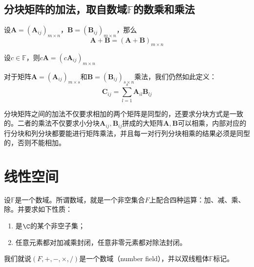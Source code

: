         \subsection{分块矩阵的加法，取自数域$\mathbb{F}$的数乘和乘法}
        设$\bm{A}=(\bm{A}_{ij})_{m\times n}$，$\bm{B}=(\bm{B}_{ij})_{m\times n}$，那么
        \begin{equation}
            \label{eq:15}
            \bm{A}+\bm{B}=(\bm{A}+\bm{B})_{m\times n}
        \end{equation}
        
        设$c\in\mathbb{F}$，则$c\bm{A}=(c\bm{A}_{ij})_{m\times n}$

        对于矩阵$\bm{A}=(\bm{A}_{ij})_{m\times s}$和$\bm{B}=(\bm{B}_{ij})_{s\times n}$乘法，我们仍然如此定义：
        \begin{equation}
            \label{eq:16}
            \bm{C}_{ij}=\sum_{l=1}^{s}\bm{A}_{il}\bm{B}_{lj}
        \end{equation}

        \begin{note}
            分块矩阵之间的加法不仅要求相加的两个矩阵是同型的，还要求分块方式是一致的。二者的乘法不仅要求小分块$\bm{A}_{ij},\bm{B}_{ij}$拼成的大矩阵$\bm{A},\bm{B}$可以相乘，内部对应的行分块和列分块都要能进行矩阵乘法，并且每一对行列分块相乘的结果必须是同型的，否则不能相加。
        \end{note}

    \section{线性空间}
    设$\mathbb{F}$是一个数域。所谓数域，就是一个非空集合$F$上配合四种运算：加、减、乘、除。并要求如下性质：
    \begin{enumerate}
        \item 是$\C$的某个非空子集；
        \item 任意元素都对加减乘封闭，任意非零元素都对除法封闭。
    \end{enumerate}
    
    我们就说$(F,+,-,\times,/)$是一个数域（number field），并以双线粗体$\mathbb{F}$标记。

